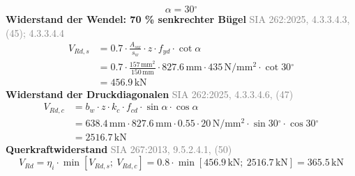 \documentclass[11pt,a4paper]{article}
\newcommand{\normref}[1]{{\small\textcolor{gray}{#1}}}
\begin{document}
\begin{equation*}
\alpha = 30{}^{\circ}
\end{equation*}
\noindent\textbf{Widerstand der Wendel: 70 \% senkrechter Bügel} \hfill \normref{SIA 262:2025, 4.3.3.4.3, (45); 4.3.3.4.4}
\begin{equation*}
\begin{aligned}
  V_{Rd,s} &= 0.7 \cdot \frac{A_{sw}}{s_w} \cdot z \cdot f_{yd} \cdot \cot \alpha \\
  &= 0.7 \cdot \frac{157\,\mathrm{mm}^{2}}{150\,\mathrm{mm}} \cdot 827.6\,\mathrm{mm} \cdot 435\,\mathrm{N}/\mathrm{mm}^{2} \cdot \cot 30{}^{\circ} \\
  &= 456.9\,\mathrm{kN}
\end{aligned}
\end{equation*}
\noindent\textbf{Widerstand der Druckdiagonalen} \hfill \normref{SIA 262:2025, 4.3.3.4.6, (47)}
\begin{equation*}
\begin{aligned}
  V_{Rd,c} &= b_w \cdot z \cdot k_c \cdot f_{cd} \cdot \sin \alpha \cdot \cos \alpha \\
  &= 638.4\,\mathrm{mm} \cdot 827.6\,\mathrm{mm} \cdot 0.55 \cdot 20\,\mathrm{N}/\mathrm{mm}^{2} \cdot \sin 30{}^{\circ} \cdot \cos 30{}^{\circ} \\
  &= 2516.7\,\mathrm{kN}
\end{aligned}
\end{equation*}
\noindent\textbf{Querkraftwiderstand} \hfill \normref{SIA 267:2013, 9.5.2.4.1, (50)}
\begin{equation*}
V_{Rd} = \eta_i \cdot \min\left[V_{Rd,s};\ V_{Rd,c}\right] = 0.8 \cdot \min\left[456.9\,\mathrm{kN};\ 2516.7\,\mathrm{kN}\right] = 365.5\,\mathrm{kN}
\end{equation*}
\end{document}
